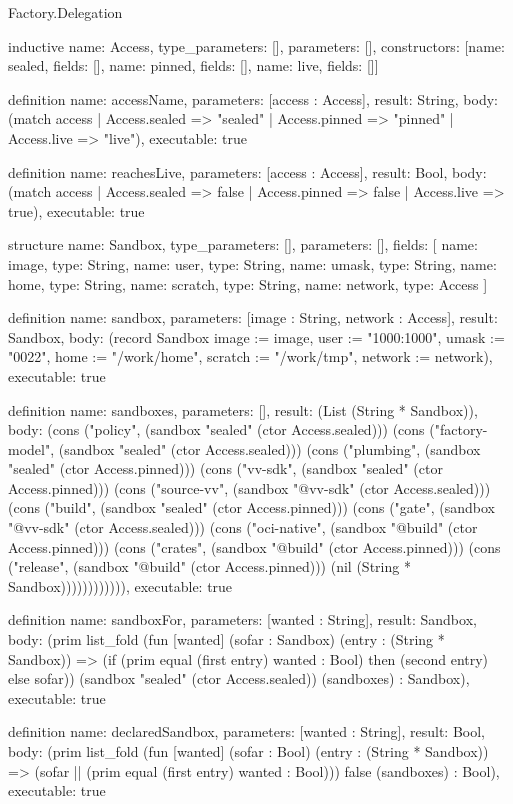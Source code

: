 \begin{lexlean}{Factory.Delegation}
\begin{semanticmodule}
inductive{
  name: Access,
  type_parameters: [],
  parameters: [],
  constructors: [{name: sealed, fields: []}, {name: pinned, fields: []}, {name: live, fields: []}]
}

definition{
  name: accessName,
  parameters: [access : Access],
  result: String,
  body: (match access
    | Access.sealed => "sealed"
    | Access.pinned => "pinned"
    | Access.live => "live"),
  executable: true
}

definition{
  name: reachesLive,
  parameters: [access : Access],
  result: Bool,
  body: (match access
    | Access.sealed => false
    | Access.pinned => false
    | Access.live => true),
  executable: true
}

structure{
  name: Sandbox,
  type_parameters: [],
  parameters: [],
  fields: [
    {name: image, type: String},
    {name: user, type: String},
    {name: umask, type: String},
    {name: home, type: String},
    {name: scratch, type: String},
    {name: network, type: Access}
  ]
}

definition{
  name: sandbox,
  parameters: [image : String, network : Access],
  result: Sandbox,
  body: (record Sandbox {image := image, user := "1000:1000", umask := "0022", home := "/work/home", scratch := "/work/tmp", network := network}),
  executable: true
}

definition{
  name: sandboxes,
  parameters: [],
  result: (List (String * Sandbox)),
  body: (cons ("policy", (sandbox "sealed" (ctor Access.sealed))) (cons ("factory-model", (sandbox "sealed" (ctor Access.sealed))) (cons ("plumbing", (sandbox "sealed" (ctor Access.pinned))) (cons ("vv-sdk", (sandbox "sealed" (ctor Access.pinned))) (cons ("source-vv", (sandbox "@vv-sdk" (ctor Access.sealed))) (cons ("build", (sandbox "sealed" (ctor Access.pinned))) (cons ("gate", (sandbox "@vv-sdk" (ctor Access.sealed))) (cons ("oci-native", (sandbox "@build" (ctor Access.pinned))) (cons ("crates", (sandbox "@build" (ctor Access.pinned))) (cons ("release", (sandbox "@build" (ctor Access.pinned))) (nil (String * Sandbox)))))))))))),
  executable: true
}

definition{
  name: sandboxFor,
  parameters: [wanted : String],
  result: Sandbox,
  body: (prim list_fold (fun [wanted] (sofar : Sandbox) (entry : (String * Sandbox)) => (if (prim equal (first entry) wanted : Bool) then (second entry) else sofar)) (sandbox "sealed" (ctor Access.sealed)) (sandboxes) : Sandbox),
  executable: true
}

definition{
  name: declaredSandbox,
  parameters: [wanted : String],
  result: Bool,
  body: (prim list_fold (fun [wanted] (sofar : Bool) (entry : (String * Sandbox)) => (sofar || (prim equal (first entry) wanted : Bool))) false (sandboxes) : Bool),
  executable: true
}


\end{semanticmodule}
\end{lexlean}
